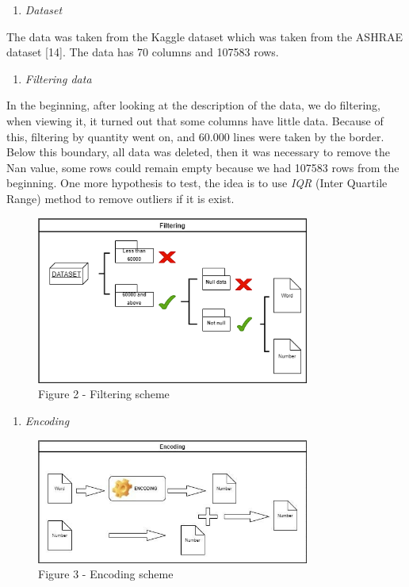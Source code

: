 \begin{enumerate}
\def\labelenumi{\Alph{enumi}.}
\item
  \emph{Dataset}
\end{enumerate}

The data was taken from the Kaggle dataset which was taken from the
ASHRAE dataset {[}14{]}. The data has 70 columns and 107583 rows.

\begin{enumerate}
\def\labelenumi{\Alph{enumi}.}
\setcounter{enumi}{1}
\item
  \emph{Filtering data}
\end{enumerate}

In the beginning, after looking at the description of the data, we do
filtering, when viewing it, it turned out that some columns have little
data. Because of this, filtering by quantity went on, and 60.000 lines
were taken by the border. Below this boundary, all data was deleted,
then it was necessary to remove the Nan value, some rows could remain
empty because we had 107583 rows from the beginning. One more hypothesis
to test, the idea is to use \emph{IQR} (Inter Quartile Range) method to
remove outliers if it is exist.

\begin{figure}[H]
	\centering
	\includegraphics[width=0.8\textwidth]{media/ict/image18}
	\caption*{Figure 2 - Filtering scheme}
\end{figure}

\begin{enumerate}
\def\labelenumi{\Alph{enumi}.}
\setcounter{enumi}{2}
\item
  \emph{Encoding}
\end{enumerate}

\begin{figure}[H]
	\centering
	\includegraphics[width=0.8\textwidth]{media/ict/image19}
	\caption*{Figure 3 - Encoding scheme}
\end{figure}

